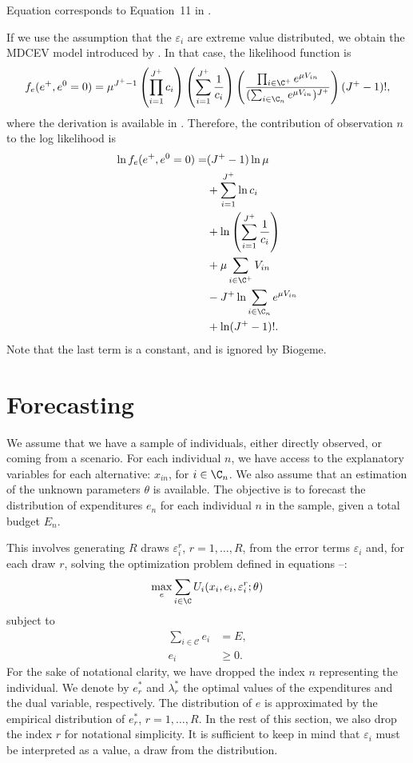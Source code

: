 \documentclass[12pt,a4paper]{article}
\begin{document}
Equation  corresponds to Equation~11 in .

If we use the assumption that the $\varepsilon_{i}$ are extreme value distributed, we obtain the MDCEV model introduced by . In that case,  the likelihood function  is
\begin{equation}
  f_e(e^+, e^0=0) = \mu^{J^+-1}\left(\prod_{i=1}^{J^+} c_i\right)\left(\sum_{i=1}^{J^+}\frac{1}{c_i}\right) \left( \frac{\prod_{i \in \C^+} e^{\mu V_{in}}}{(\sum_{i\in\C_n} e^{\mu V_{in}})^{J^+}} \right) (J^+-1)!,
\end{equation}
where the derivation is available in . Therefore, the contribution of observation $n$ to the log likelihood is
\begin{align*}
  \ln  f_e(e^+, e^0=0) =& (J^+-1) \ln \mu \\
  &+ \sum_{i=1}^{J^+} \ln c_i \\
  &+ \ln\left(\sum_{i=1}^{J^+}\frac{1}{c_i}\right)\\
  &+ \mu \sum_{i \in \C^+} V_{in} \\
  &- J^+ \ln \sum_{i\in\C_n} e^{\mu V_{in}} \\
  &+ \ln (J^+-1)!.
\end{align*}
Note that the last term is a constant, and is ignored by Biogeme.

\section{Forecasting}
\label{sec:forecasting}
We assume that we have  a sample of individuals, either directly observed, or coming from a scenario. For each individual $n$, we have access to the explanatory
variables for each alternative: $x_{in}$, for $i \in \C_n$. We also assume that an estimation of the unknown parameters $\theta$ is available. The objective is to forecast the
distribution of expenditures $e_{n}$ for each individual $n$ in the sample, given a total budget $E_n$.

This involves generating $R$ draws $\varepsilon^r_i$, $r=1, \ldots, R$, from the error terms $\varepsilon_{i}$ and, for each draw $r$, solving the
optimization problem defined in equations --:
\[
\max_{e} \sum_{i \in \C} U_{i}(x_{i}, e_{i}, \varepsilon^r_i; \theta)
\]
subject to
\begin{align*}
  \sum_{i \in \mathcal{C}} e_{i} &= E,\\
 e_{i} &\geq 0.
\end{align*}
For the sake of notational clarity, we have dropped the index $n$ representing the individual. We denote by $e_r^*$ and $\lambda_r^*$
the optimal values of the expenditures and the dual variable, respectively. The distribution of $e$ is approximated by the empirical distribution
of $e_r^*$, $r=1, \ldots, R$. In the rest of this section, we also drop the index $r$ for notational simplicity.
It is sufficient to keep in mind that $\varepsilon_i$ must be interpreted as a value, a draw from the distribution.
\end{document}
